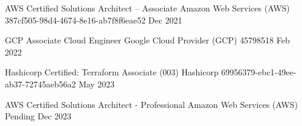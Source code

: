 

\begin{cvhonors}

  \cvhonor
    {AWS Certified Solutions Architect – Associate} %
    {Amazon Web Services (AWS)} %
    {387cf505-98d4-4674-8e16-ab7f8f6eae52} %
    {Dec 2021} %

  \cvhonor
    {GCP Associate Cloud Engineer} %
    {Google Cloud Provider (GCP)} %
    {45798518} %
    {Feb 2022} %

  \cvhonor
    {Hashicorp Certified: Terraform Associate (003)} %
    {Hashicorp} %
    {69956379-ebc1-49ee-ab37-72745aeb56a2} %
    {May 2023} %

  \cvhonor
    {AWS Certified Solutions Architect - Professional} %
    {Amazon Web Services (AWS)} %
    {Pending} %
    {Dec 2023} %

\end{cvhonors}
